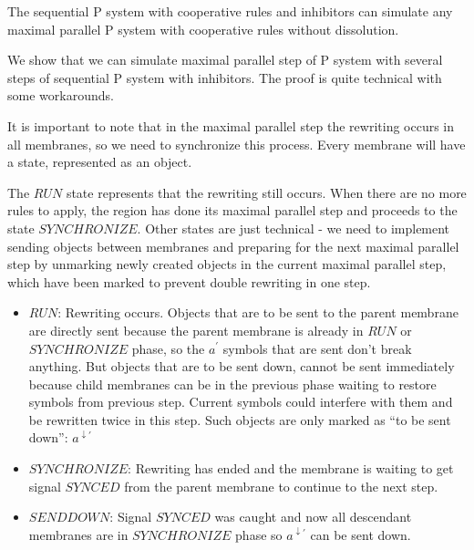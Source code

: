 \begin{veta}
  The sequential P system with cooperative rules and inhibitors can simulate any maximal parallel P system with cooperative rules without dissolution.
\end{veta}

\begin{dokaz}
  We show that we can simulate maximal parallel step of P system with several steps of sequential P system with inhibitors. The proof is quite technical with some workarounds.


  It is important to note that in the maximal parallel step the rewriting occurs in all membranes, so we need to synchronize this process. Every membrane will have a state, represented as an object.

  The $\mathit{RUN}$ state represents that the rewriting still occurs. When there are no more rules to apply, the region has done its maximal parallel step and proceeds to the state $\mathit{SYNCHRONIZE}$. Other states are just technical - we need to implement sending objects between membranes and preparing for the next maximal parallel step by unmarking newly created objects in the current maximal parallel step, which have been marked to prevent double rewriting in one step.

  \begin{itemize}
    \item $\mathit{RUN}$: Rewriting occurs. Objects that are to be sent to the parent membrane are directly sent because the parent membrane is already in $\mathit{RUN}$ or $\mathit{SYNCHRONIZE}$ phase, so the $a^{\prime}$ symbols that are sent don't break anything. But objects that are to be sent down, cannot be sent immediately because child membranes can be in the previous phase waiting to restore symbols from previous step. Current symbols could interfere with them and be rewritten twice in this step. Such objects are only marked as ``to be sent down'': $a^{\downarrow\prime}$

    \item $\mathit{SYNCHRONIZE}$: Rewriting has ended and the membrane is waiting to get signal $\mathit{SYNCED}$ from the parent membrane to continue to the next step.

    \item $\mathit{SENDDOWN}$: Signal $\mathit{SYNCED}$ was caught and now all descendant membranes are in $\mathit{SYNCHRONIZE}$ phase so $a^{\downarrow\prime}$ can be sent down.


\end{itemize}
\end{dokaz}
